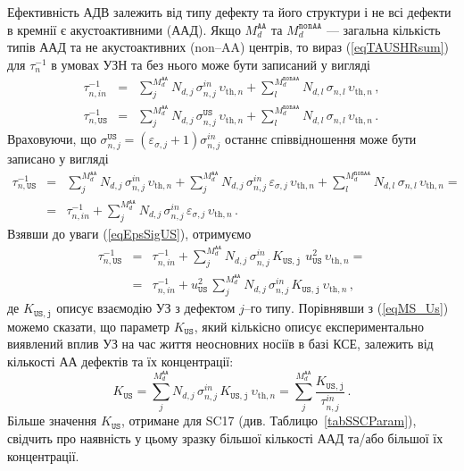 Ефективність АДВ залежить від типу дефекту та його структури \cite{UST:Medvid}
і не всі дефекти в кремнії є акустоактивними (ААД).
Якщо $M_d^\mathtt{AA}$ та $M_d^\mathtt{nonAA}$ --- загальна кількість типів ААД та не акустоактивних (non--AA) центрів,
то вираз (\ref{eqTAUSHRsum}) для $\tau_{n}^{-1}$ в умовах УЗН та без нього може бути записаний у вигляді
\begin{eqnarray}
\tau_{n,in}^{-1}&=&\sum_j^{M_d^\mathtt{AA}}N_{d,j}\,\sigma_{n,j}^{in}\,\upsilon_{\mathrm{th},n}+
\sum_l^{M_d^\mathtt{nonAA}}N_{d,l}\,\sigma_{n,l}\,\upsilon_{\mathrm{th},n}\,,\\
\tau_{n,\mathtt{US}}^{-1}&=&\sum_j^{M_d^\mathtt{AA}}N_{d,j}\,\sigma_{n,j}^\mathtt{US}\,\upsilon_{\mathrm{th},n}+
\sum_l^{M_d^\mathtt{nonAA}}N_{d,l}\,\sigma_{n,l}\,\upsilon_{\mathrm{th},n}\,.
\end{eqnarray}
Враховуючи, що $\sigma_{n,j}^\mathtt{US}=(\varepsilon_{\sigma,j}+1)\sigma_{n,j}^{in}$ останнє співвідношення може бути записано
у вигляді
\begin{eqnarray}
\label{eqEpsSigUSA}
\tau_{n,\mathtt{US}}^{-1}&=&\sum_j^{M_d^\mathtt{AA}}N_{d,j}\,\sigma_{n,j}^{in}\,\upsilon_{\mathrm{th},n}+
\sum_j^{M_d^\mathtt{AA}}N_{d,j}\,\sigma_{n,j}^{in}\,\varepsilon_{\sigma,j}\,\upsilon_{\mathrm{th},n}+
\sum_l^{M_d^\mathtt{nonAA}}N_{d,l}\,\sigma_{n,l}\,\upsilon_{\mathrm{th},n}=\nonumber\\
&=&\tau_{n,in}^{-1}+\sum_j^{M_d^\mathtt{AA}}N_{d,j}\,\sigma_{n,j}^{in}\,\varepsilon_{\sigma,j}\,\upsilon_{\mathrm{th},n}\,.
\end{eqnarray}
Взявши до уваги (\ref{eqEpsSigUS}), отримуємо
\begin{eqnarray}
\tau_{n,\mathtt{US}}^{-1}&=&\tau_{n,in}^{-1}+
\sum_j^{M_d^\mathtt{AA}}N_{d,j}\,\sigma_{n,j}^{in}\,K_\mathtt{US,j}\,\,u_{\mathtt{US}}^2\,\upsilon_{\mathrm{th},n}=\nonumber\\
&=&\tau_{n,in}^{-1}+u_{\mathtt{US}}^2\,\sum_j^{M_d^\mathtt{AA}}N_{d,j}\,\sigma_{n,j}^{in}\,K_\mathtt{US,j}\,\upsilon_{\mathrm{th},n}\,,
\end{eqnarray}
де $K_\mathtt{US,j}$ описує взаємодію УЗ з дефектом $j$--го типу.
Порівнявши з (\ref{eqMS_Us}) можемо сказати, що параметр $K_\mathtt{US}$, який кількісно описує експериментально виявлений вплив УЗ на час життя неосновних носіїв в базі КСЕ,
залежить від кількості АА дефектів та їх концентрації:
\begin{equation}
\label{eqKUS}
K_\mathtt{US}=\sum_j^{M_d^\mathtt{AA}}N_{d,j}\,\sigma_{n,j}^{in}\,K_\mathtt{US,j}\,\upsilon_{\mathrm{th},n}=\sum_j^{M_d^\mathtt{AA}}\frac{K_\mathtt{US,j}}{\tau_{n,j}^{in}}\,.
\end{equation}
Більше значення $K_\mathtt{US}$, отримане для SC17 (див. Таблицю~\ref{tabSSCParam}), свідчить про наявність у цьому зразку більшої кількості ААД та/або більшої їх концентрації.

